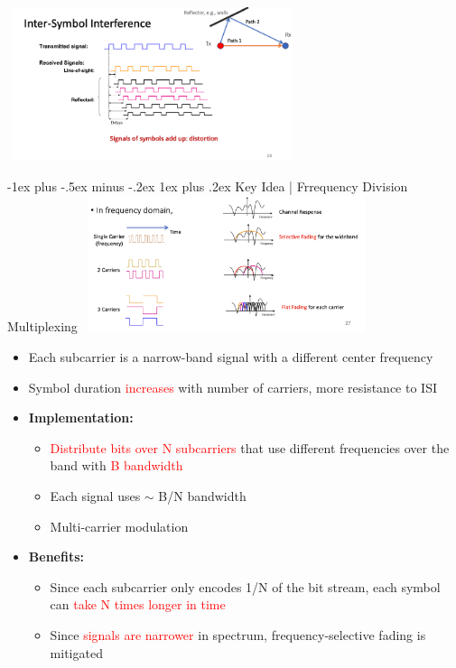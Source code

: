 \documentclass[10pt,landscape]{article}
\makeatletter
\newcommand{\subsubsubsection}{\@startsection{subsubsection}{3}{0mm}%
                                {-1ex plus -.5ex minus -.2ex}%
                                {1ex plus .2ex}%
                                {\normalfont\scriptsize\bfseries}}
\newcommand{\1}{\mathmybb{1}}
\makeatother
\begin{document}
\begin{multicols*}{3}
\includegraphics*[width=8.5cm, height=4.5cm]{images/intersymbolinterference.png}

\subsubsubsection{Key Idea | Frrequency Division Multiplexing}
\includegraphics*[width=8.5cm, height=4cm]{images/distributebitsoversubcarriers.png}

\begin{itemize}
  \item Each subcarrier is a narrow-band signal with a different center frequency
  \item Symbol duration \textcolor{red}{increases} with number of carriers, more resistance to ISI
  \item \textbf{Implementation:}
  \begin{itemize}
    \item \textcolor{red}{Distribute bits over N subcarriers} that use different frequencies over the band with \textcolor{red}{B bandwidth}
    \item Each signal uses $\sim$ B/N bandwidth
    \item Multi-carrier modulation
  \end{itemize}
  \item \textbf{Benefits:}
  \begin{itemize}
    \item Since each subcarrier only encodes 1/N of the bit stream, each symbol can \textcolor{red}{take N times longer in time}
    \item Since \textcolor{red}{signals are narrower} in spectrum, frequency-selective fading is mitigated
  \end{itemize}
\end{itemize}


\end{multicols*}
\end{document}
